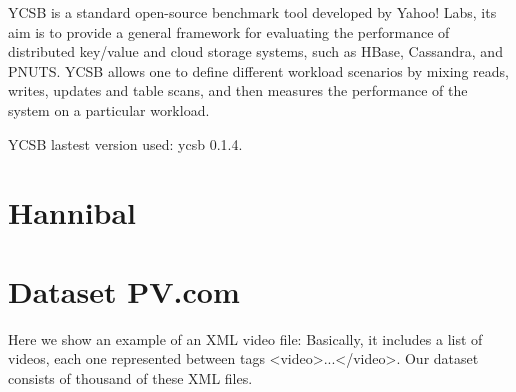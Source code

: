 YCSB\cite{cooper2010benchmarking} is a standard open-source benchmark tool developed by Yahoo! Labs, its aim is to provide a general framework for evaluating the performance of distributed key/value and cloud storage systems, such as HBase, Cassandra, and PNUTS. YCSB allows one to define different workload scenarios by mixing reads, writes, updates and table scans, and then measures the performance of the system on a particular workload.
\par
{}
\par
YCSB lastest version \cite{YCSB} used: ycsb 0.1.4.

\section{Hannibal}





\section{Dataset PV.com}

Here we show an example of an XML video file:
Basically, it includes a list of videos, each one represented between tags <video>...</video>. Our dataset consists of thousand of these XML files.


